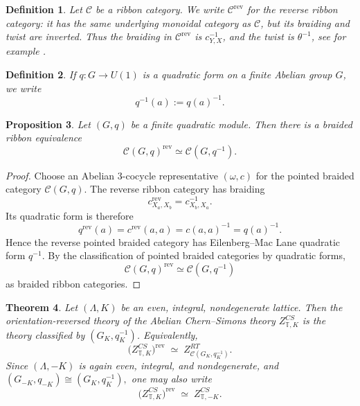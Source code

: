 \documentclass[12pt]{amsart}
\numberwithin{equation}{section}
\newtheorem{theorem}{Theorem}[section]
\newtheorem{prop}[theorem]{Proposition}
\newtheorem{definition}[theorem]{Definition}
\theoremstyle{definition}
\begin{document}
\begin{definition}
Let $\mathcal C$ be a ribbon category.  We write $\mathcal C^{\mathrm{rev}}$ for the
reverse ribbon category: it has the same underlying monoidal category as $\mathcal C$,
but its braiding and twist are inverted.
Thus the braiding in $\mathcal C^{\mathrm{rev}}$ is $c^{-1}_{Y,X}$, and the twist is
$\theta^{-1}$, see for example \cite{Joyal-Street}.
\end{definition}

\begin{definition}
If $q:G\to U(1)$ is a quadratic form on a finite Abelian group $G$, we write
$$
q^{-1}(a):=q(a)^{-1}.
$$
\end{definition}

\begin{prop}
\label{prop:reverse-pointed}
Let $(G,q)$ be a finite quadratic module.  Then there is a braided ribbon equivalence
$$
\mathcal C(G,q)^{\mathrm{rev}}\simeq \mathcal C(G,q^{-1}).
$$
\end{prop}

\begin{proof}
Choose an Abelian $3$-cocycle representative $(\omega,c)$
for the pointed braided category $\mathcal C(G,q)$.
The reverse ribbon category has braiding
$$c^{\mathrm{rev}}_{X_a,X_b}=c^{-1}_{X_b,X_a}.$$
Its quadratic form is therefore
$$q^{\mathrm{rev}}(a)=c^{\mathrm{rev}}(a,a)=c(a,a)^{-1}=q(a)^{-1}.
$$
Hence the reverse pointed braided category has Eilenberg--Mac Lane quadratic form $q^{-1}$. By the classification of pointed braided categories by quadratic forms,
$$
\mathcal C(G,q)^{\mathrm{rev}}
\simeq
\mathcal C(G,q^{-1})
$$
as braided ribbon categories.
\end{proof}

\begin{theorem}
\label{thm:orientation-reversed-toral}
Let $(\Lambda,K)$ be an even, integral, nondegenerate lattice.  Then the orientation-reversed theory of the Abelian Chern--Simons theory $Z^{CS}_{\mathbb T,K}$ is the theory classified by $(G_K,q_K^{-1})$.  Equivalently,
$$
\bigl(Z^{CS}_{\mathbb T,K}\bigr)^{\mathrm{rev}}
\;\simeq\;
Z^{RT}_{\mathcal C(G_K,q_K^{-1})}.
$$
Since $(\Lambda,-K)$ is again even, integral, and nondegenerate, and $(G_{-K},q_{-K})\cong (G_K,q_K^{-1}),$ one may also write
$$
\bigl(Z^{CS}_{\mathbb T,K}\bigr)^{\mathrm{rev}}
\;\simeq\;
Z^{CS}_{\mathbb T,-K}.
$$
\end{theorem}
\end{document}
